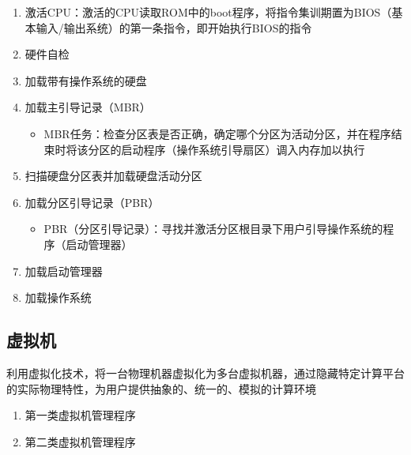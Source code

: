 \documentclass[./operating-systems.tex]{subfiles}
\begin{document}
    \begin{enumerate}
        \item 激活CPU：激活的CPU读取ROM中的boot程序，将指令集训期置为BIOS（基本输入/输出系统）的第一条指令，即开始执行BIOS的指令
        \item 硬件自检
        \item 加载带有操作系统的硬盘
        \item 加载主引导记录（MBR）
        \begin{itemize}
            \item MBR任务：检查分区表是否正确，确定哪个分区为活动分区，并在程序结束时将该分区的启动程序（操作系统引导扇区）调入内存加以执行
        \end{itemize}
        \item 扫描硬盘分区表并加载硬盘活动分区
        \item 加载分区引导记录（PBR）
        \begin{itemize}
            \item PBR（分区引导记录）：寻找并激活分区根目录下用户引导操作系统的程序（启动管理器）
        \end{itemize}
        \item 加载启动管理器
        \item 加载操作系统
    \end{enumerate}

    \subsection{虚拟机}

    利用虚拟化技术，将一台物理机器虚拟化为多台虚拟机器，通过隐藏特定计算平台的实际物理特性，为用户提供抽象的、统一的、模拟的计算环境

    \begin{enumerate}
        \item 第一类虚拟机管理程序
        \item 第二类虚拟机管理程序
    \end{enumerate}
\end{document}
